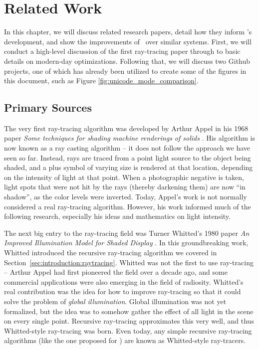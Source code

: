 %
%
\chapter{Related Work}\label{ch:relatedwork}

In this chapter, we will discuss related research papers, detail how they inform \name's development, and show the improvements of \name\ over similar systems.
First, we will conduct a high-level discussion of the first ray-tracing paper through to basic details on modern-day optimizations.
Following that, we will discuss two Github projects, one of which has already been utilized to create some of the figures in this document, such as Figure \ref{fig:unicode_mode_comparison}.

\section{Primary Sources}


The very first ray-tracing algorithm was developed by Arthur Appel in his 1968 paper {\it Some techniques for shading machine renderings of solids} \cite{appel1968some}.
His algorithm is now known as a ray casting algorithm -- it does not follow the approach we have seen so far.
Instead, rays are traced from a point light source to the object being shaded, and a plus symbol of varying size is rendered at that location, depending on the intensity of light at that point.
When a photographic negative is taken, light spots that were not hit by the rays (thereby darkening them) are now ``in shadow'', as the color levels were inverted.
Today, Appel's work is not normally considered a real ray-tracing algorithm.
However, his work informed much of the following research, especially his ideas and mathematics on light intensity.


The next big entry to the ray-tracing field was Turner Whitted's 1980 paper {\it An Improved Illumination Model for Shaded Display} \cite{whitted1980improved}.
In this groundbreaking work, Whitted introduced the recursive ray-tracing algorithm we covered in Section~\ref{sec:introduction:raytracing}.
Whitted was not the first to use ray-tracing -- Arthur Appel had first pioneered the field over a decade ago, and some commercial applications were also emerging in the field of radiosity.
Whitted's real contribution was the idea for how to improve ray-tracing so that it could solve the problem of {\it global illumination}.
Global illumination was not yet formalized, but the idea was to somehow gather the effect of all light in the scene on every single point.
Recursive ray-tracing approximates this very well, and thus Whitted-style ray-tracing was born.
Even today, any simple recursive ray-tracing algorithms (like the one proposed for \name) are known as Whitted-style ray-tracers.

